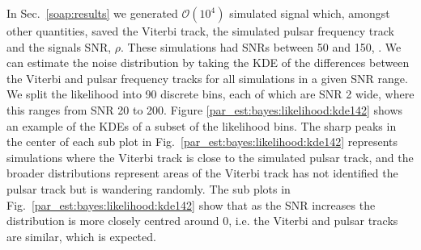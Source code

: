 In Sec.~\ref{soap:results} we generated $\mathcal{O}(10^{4})$ simulated signal which, amongst other quantities, saved the Viterbi track, the simulated pulsar frequency track and the signals \gls{SNR}, $\rho$.
These simulations had \glspl{SNR} between 50 and 150, .
We can estimate the noise distribution by taking the \gls{KDE} of the differences between the Viterbi and pulsar frequency tracks for all simulations in a given \gls{SNR} range.
We split the likelihood into 90 discrete bins, each of which are \gls{SNR} 2 wide, where this ranges from \gls{SNR} 20 to 200.
Figure \ref{par_est:bayes:likelihood:kde142} shows an example of the \glspl{KDE} of a subset of the likelihood bins. 
The sharp peaks in the center of each sub plot in Fig.~\ref{par_est:bayes:likelihood:kde142} represents simulations where the Viterbi track is close to the simulated pulsar track, and the broader distributions represent areas of the Viterbi track has not identified the pulsar track but is wandering randomly.
The sub plots in Fig.~\ref{par_est:bayes:likelihood:kde142} show that as the \gls{SNR} increases the distribution is more closely centred around 0, i.e. the Viterbi and pulsar tracks are similar, which is expected.
%
